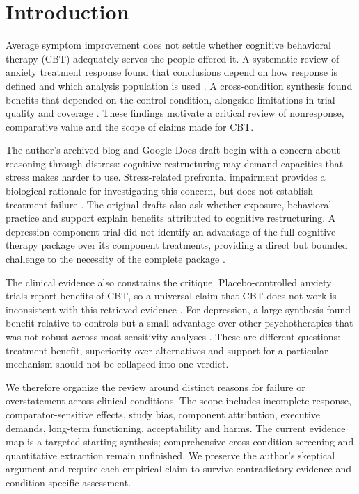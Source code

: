 \section{Introduction}
\label{sec:intro}
Average symptom improvement does not settle whether cognitive behavioral therapy (CBT) adequately serves the people offered it.
A systematic review of anxiety treatment response found that conclusions depend on how response is defined and which analysis population is used \citep{Loerinc2015}.
A cross-condition synthesis found benefits that depended on the control condition, alongside limitations in trial quality and coverage \citep{Cuijpers2025}.
These findings motivate a critical review of nonresponse, comparative value and the scope of claims made for CBT.

The author's archived blog and Google Docs draft begin with a concern about reasoning through distress: cognitive restructuring may demand capacities that stress makes harder to use.
Stress-related prefrontal impairment provides a biological rationale for investigating this concern, but does not establish treatment failure \citep{Arnsten2009}.
The original drafts also ask whether exposure, behavioral practice and support explain benefits attributed to cognitive restructuring.
A depression component trial did not identify an advantage of the full cognitive-therapy package over its component treatments, providing a direct but bounded challenge to the necessity of the complete package \citep{Jacobson1996}.

The clinical evidence also constrains the critique.
Placebo-controlled anxiety trials report benefits of CBT, so a universal claim that CBT does not work is inconsistent with this retrieved evidence \citep{Carpenter2018}.
For depression, a large synthesis found benefit relative to controls but a small advantage over other psychotherapies that was not robust across most sensitivity analyses \citep{Cuijpers2023}.
These are different questions: treatment benefit, superiority over alternatives and support for a particular mechanism should not be collapsed into one verdict.

We therefore organize the review around distinct reasons for failure or overstatement across clinical conditions.
The scope includes incomplete response, comparator-sensitive effects, study bias, component attribution, executive demands, long-term functioning, acceptability and harms.
The current evidence map is a targeted starting synthesis; comprehensive cross-condition screening and quantitative extraction remain unfinished.
We preserve the author's skeptical argument and require each empirical claim to survive contradictory evidence and condition-specific assessment.


